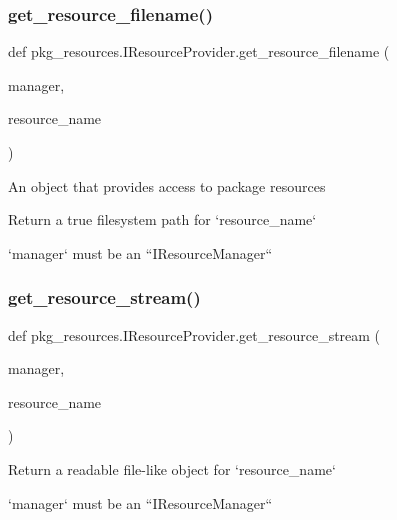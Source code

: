 \subsubsection{\texorpdfstring{get\+\_\+resource\+\_\+filename()}{get\_resource\_filename()}}
{\footnotesize\ttfamily def pkg\+\_\+resources.\+I\+Resource\+Provider.\+get\+\_\+resource\+\_\+filename (\begin{DoxyParamCaption}\item[{}]{manager,  }\item[{}]{resource\+\_\+name }\end{DoxyParamCaption})}

\begin{DoxyVerb}An object that provides access to package resources\end{DoxyVerb}
\begin{DoxyVerb}Return a true filesystem path for `resource_name`

`manager` must be an ``IResourceManager``\end{DoxyVerb}
 \mbox{\label{classpkg__resources_1_1_i_resource_provider_ac027f5f8836dadb75f0d05c4d919fa1b}} 
\subsubsection{\texorpdfstring{get\+\_\+resource\+\_\+stream()}{get\_resource\_stream()}}
{\footnotesize\ttfamily def pkg\+\_\+resources.\+I\+Resource\+Provider.\+get\+\_\+resource\+\_\+stream (\begin{DoxyParamCaption}\item[{}]{manager,  }\item[{}]{resource\+\_\+name }\end{DoxyParamCaption})}

\begin{DoxyVerb}Return a readable file-like object for `resource_name`

`manager` must be an ``IResourceManager``\end{DoxyVerb}
 \mbox{\label{classpkg__resources_1_1_i_resource_provider_a2c860463185ea5a8c02d904afaa72a31}} 

